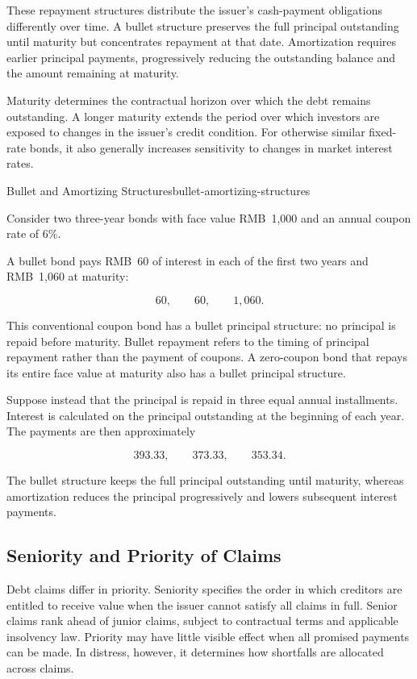 These repayment structures distribute the issuer's
cash-payment obligations differently over time.
A bullet structure preserves the full principal
outstanding until maturity but concentrates repayment
at that date. Amortization requires earlier principal
payments, progressively reducing the outstanding
balance and the amount remaining at maturity.

Maturity determines the contractual horizon over which
the debt remains outstanding. A longer maturity extends
the period over which investors are exposed to changes
in the issuer's credit condition. For otherwise similar
fixed-rate bonds, it also generally increases sensitivity
to changes in market interest rates.

\begin{example}{Bullet and Amortizing Structures}{bullet-amortizing-structures}

Consider two three-year bonds with face value RMB~1,000 and an annual coupon rate of 6\%.

A bullet bond pays RMB~60 of interest in each of the first two years and RMB~1,060 at maturity:

\[
60,\qquad 60,\qquad 1,060.
\]

This conventional coupon bond has a bullet principal
structure: no principal is repaid before maturity.
Bullet repayment refers to the timing of principal
repayment rather than the payment of coupons.
A zero-coupon bond that repays its entire face value
at maturity also has a bullet principal structure.

\medskip

Suppose instead that the principal is repaid in three equal annual installments. Interest is calculated on the principal outstanding at the beginning of each year. The payments are then approximately

\[
393.33,\qquad 373.33,\qquad 353.34.
\]

The bullet structure keeps the full principal outstanding until maturity, whereas amortization reduces the principal progressively and lowers subsequent interest payments. 

\end{example}


\subsection{Seniority and Priority of Claims}

Debt claims differ in priority. Seniority specifies the order in which creditors are entitled to receive value when the issuer cannot satisfy all claims in full. Senior claims rank ahead of junior claims, subject to contractual terms and applicable insolvency law. Priority may have little visible effect when all promised payments can be made. In distress, however, it determines how shortfalls are allocated across claims.

